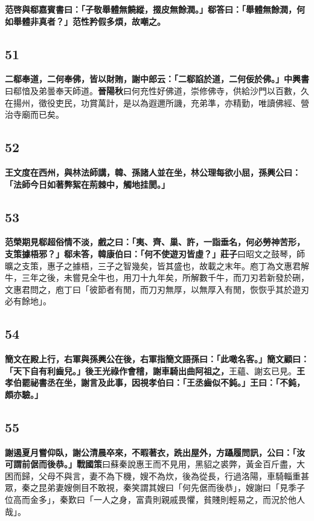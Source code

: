 \textbf{范啓與郗嘉賓書曰：「子敬舉體無饒縱，掇皮無餘潤。」郗答曰：「舉體無餘潤，何如舉體非真者？」范性矜假多煩，故嘲之。}

\subsection*{51}

\textbf{二郗奉道，二何奉佛，皆以財賄，謝中郎云：「二郗諂於道，二何佞於佛。」}{\footnotesize \textbf{中興書}曰郗愔及弟曇奉天師道。\textbf{晉陽秋}曰何充性好佛道，崇修佛寺，供給沙門以百數，久在揚州，徵役吏民，功賞萬計，是以為遐邇所譏，充弟準，亦精勤，唯讀佛經、營治寺廟而已矣。}

\subsection*{52}

\textbf{王文度在西州，與林法師講，韓、孫諸人並在坐，林公理每欲小屈，孫興公曰：「法師今日如著弊絮在荊棘中，觸地挂閡。」}

\subsection*{53}

\textbf{范榮期見郗超俗情不淡，戲之曰：「夷、齊、巢、許，一詣垂名，何必勞神苦形，支策據梧邪？」郗未答，韓康伯曰：「何不使遊刃皆虛？」}{\footnotesize \textbf{莊子}曰昭文之鼓琴，師曠之支策，惠子之據梧，三子之智幾矣，皆其盛也，故載之末年。庖丁為文惠君解牛，三年之後，未嘗見全牛也，用刀十九年矣，所解數千牛，而刀刃若新發於硎，文惠君問之，庖丁曰「彼節者有閒，而刀刃無厚，以無厚入有閒，恢恢乎其於遊刃必有餘地」。}

\subsection*{54}

\textbf{簡文在殿上行，右軍與孫興公在後，右軍指簡文語孫曰：「此噉名客。」簡文顧曰：「天下自有利齒兒。」後王光祿作會稽，謝車騎出曲阿祖之，}{\footnotesize 王蘊、謝玄已見。}\textbf{王孝伯罷祕書丞在坐，謝言及此事，因視孝伯曰：「王丞齒似不鈍。」王曰：「不鈍，頗亦驗。」}

\subsection*{55}

\textbf{謝遏夏月嘗仰臥，謝公清晨卒來，不暇著衣，跣出屋外，方躡履問訊，公曰：「汝可謂前倨而後恭。」}{\footnotesize \textbf{戰國策}曰蘇秦說惠王而不見用，黑貂之裘弊，黃金百斤盡，大困而歸，父母不與言，妻不為下機，嫂不為炊，後為從長，行過洛陽，車騎輜重甚眾，秦之昆弟妻嫂側目不敢視，秦笑謂其嫂曰「何先倨而後恭」，嫂謝曰「見季子位高而金多」，秦歎曰「一人之身，富貴則親戚畏懼，貧賤則輕易之，而況於他人哉」。}

